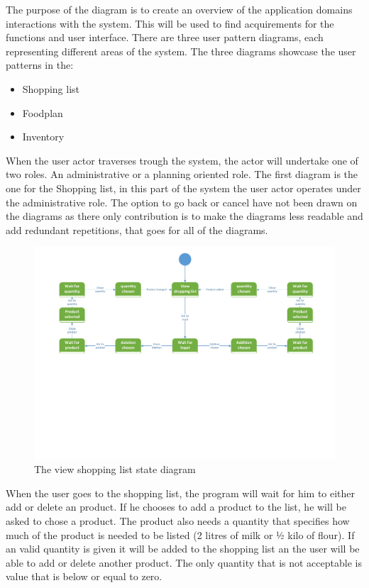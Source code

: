The purpose of the diagram is to create an overview of the application domains interactions with the system. This will be used to find acquirements for the functions and user interface. There are three user pattern diagrams, each representing different areas of the system. The three diagrams showcase the user patterns in the:
\begin{itemize}
\item{Shopping list}
\item{Foodplan}
\item{Inventory}
\end{itemize}

When the user actor traverses trough the system, the actor will undertake one of two roles. An administrative or a planning oriented role.
The first diagram is the one for the Shopping list, in this part of the system the user actor operates under the administrative role.
The option to go back or cancel have not been drawn on the diagrams as there only contribution is to make the diagrams less readable and add redundant repetitions, that goes for all of the diagrams.

\begin{figure}[H]
	\centering
	\includegraphics[width=1.0\textwidth]{ApplicationDomain/upShoppingList.pdf} 
	\caption{The view shopping list state diagram}
	\label{Shopping_List_Figure}
\end{figure}
When the user goes to the shopping list, the program will wait for him to either add or delete an product. If he chooses to add a product to the list, he will be asked to chose a product. The product also needs a quantity that specifies how much of the product is needed to be listed (2 litres of milk or ½ kilo of flour). If an valid quantity is given it will be added to the shopping list an the user will be able to add or delete another product. The only quantity that is not acceptable is value that is below or equal to zero.

